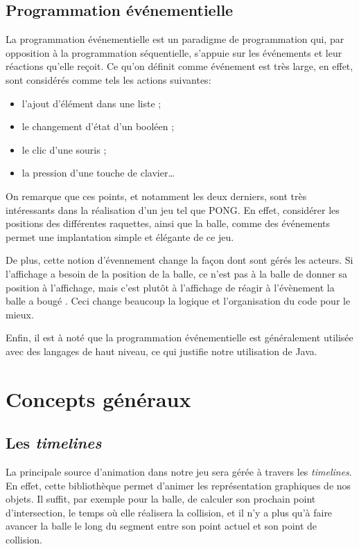 \documentclass[a4paper,10pt]{article}
\theoremstyle{definition}
\begin{document}
	
  \subsection{Programmation événementielle}
	La programmation événementielle est un paradigme de programmation qui, par opposition à la programmation séquentielle, s'appuie sur les événements et leur réactions qu'elle reçoit. Ce qu'on définit comme \og événement \fg{} est très large, en effet, sont considérés comme tels les actions suivantes:
	\begin{itemize}
		\item l'ajout d'élément dans une liste ;
		\item le changement d'état d'un booléen ;
		\item le clic d'une souris ;
		\item la pression d'une touche de clavier\dots
	\end{itemize} 
	
	On remarque que ces points, et notamment les deux derniers, sont très intéressants dans la réalisation d'un jeu tel que PONG. En effet, considérer les positions des différentes raquettes, ainsi que la balle, comme des événements permet une implantation simple et élégante de ce jeu.

	De plus, cette notion d'évennement change la façon dont sont gérés les acteurs. Si l'affichage a besoin de la position de la balle, ce n'est pas à la balle de donner sa position à l'affichage, mais c'est plutôt à l'affichage de réagir à l'évènement \og la balle a bougé \fg. Ceci change beaucoup la logique et l'organisation du code pour le mieux.
	
	Enfin, il est à noté que la programmation événementielle est généralement utilisée avec des langages de haut niveau, ce qui justifie notre utilisation de Java.
	
\section{Concepts généraux}
%

    \subsection{Les \emph{timelines}}
    La principale source d'animation dans notre jeu sera gérée à travers les \emph{timelines}. En effet, cette bibliothèque permet d'animer les représentation graphiques de nos objets. Il suffit, par exemple pour la balle, de calculer son prochain point d'intersection, le temps où elle réalisera la collision, et il n'y a plus qu'à faire avancer la balle le long du segment entre son point actuel et son point de collision.
    
\end{document}
